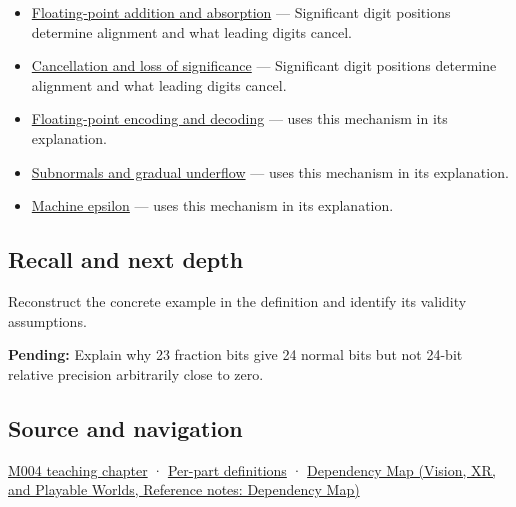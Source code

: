 \hypertarget{appendix-a24fd710cf67-used-by}{}

\begin{itemize}
\item
  \hyperref[appendix-a1b1b4580dfd]{Floating-point addition and absorption} --- Significant digit positions determine alignment and what leading digits cancel.
\item
  \hyperref[appendix-a2773a6a2f9d]{Cancellation and loss of significance} --- Significant digit positions determine alignment and what leading digits cancel.
\item
  \hyperref[appendix-6854d0e2218e]{Floating-point encoding and decoding} --- uses this mechanism in its explanation.
\item
  \hyperref[appendix-00a6e044c437]{Subnormals and gradual underflow} --- uses this mechanism in its explanation.
\item
  \hyperref[appendix-390ea641da54]{Machine epsilon} --- uses this mechanism in its explanation.
\end{itemize}

\subsection{Recall and next depth}\label{appendix-a24fd710cf67-recall-and-next-depth}

\hypertarget{appendix-a24fd710cf67-recall-and-next-depth}{}

Reconstruct the concrete example in the definition and identify its validity assumptions.

\textbf{Pending:} Explain why 23 fraction bits give 24 normal bits but not 24-bit relative precision arbitrarily close to zero.

\subsection{Source and navigation}\label{appendix-a24fd710cf67-source-and-navigation}

\hypertarget{appendix-a24fd710cf67-source-and-navigation}{}

\hyperref[01-foundations-i-ch001-a-stretching-ruler-for-real-valued-quantities]{M004 teaching chapter} · \hyperref[appendix-fd090d982a15-m004---parts-61-76]{Per-part definitions} · \href{../07-Vision-XR-and-Playable-Worlds/main.pdf\#nameddest=appendix-4ad47bdd269a}{Dependency Map (Vision, XR, and Playable Worlds, Reference notes: Dependency Map)}
